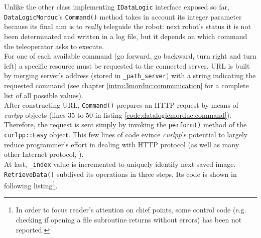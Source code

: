 Unlike the other class implementing \texttt{IDataLogic} interface
exposed so far, \texttt{DataLogicMorduc}'s \texttt{Command()} method takes
in account its integer parameter because its final aim is to
\textit{really} teleguide the robot: next robot's status it is
not been determinated and written in a log file, but it depends
on which command the teleoperator asks to execute.
\\
For one of each available command (go forward, go backward, turn right
and turn left) a specific resource must be requested to the connected
\morduc{} server. URL is built by merging server's address (stored
in \texttt{\_path\_server}) with a string indicating the requested
command (see chapter \ref{intro:3morduc:communication} for a complete
list of all possible values).
\\
After constructing URL, \texttt{Command()} prepares an HTTP
request by means of \textit{curlpp} objects (lines 35 to 50 in listing
\ref{code:datalogicmorduc:command}). Therefore, the request is sent
simply by invoking the \texttt{perform()} method of the
\texttt{curlpp::Easy} object. This few lines of code evince
\textit{curlpp}'s potential to largely reduce programmer's effort in
dealing with HTTP protocol (as well as many other Internet protocol,
\cite{library:curlpp}).
\\
At last, \texttt{\_index} value is incremented to uniquely identify
next saved image.
\\
\texttt{RetrieveData()} subdived its operations in three steps. Its
code is shown in following listing\footnote{In order to
focus reader's attention on chief points, some control code (e.g. checking
if opening a file subroutine returns without errors) has been not reported.}.
\\
